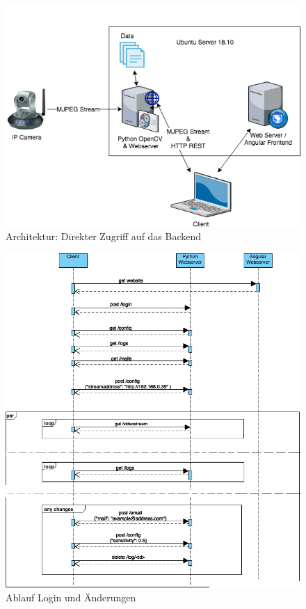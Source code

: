 \begin{figure}[]
	\centering
	\includegraphics[width=\textwidth]{content/pictures/architecture-change.png}
	\caption{Architektur: Direkter Zugriff auf das Backend}
	\label{img:architecture-change}
\end{figure}

\begin{figure}[]
	\centering
	\includegraphics[width=\textwidth]{content/pictures/sequencediagram.png}
	\caption{Ablauf Login und Änderungen}
	\label{img:sequencediagram}
\end{figure}

